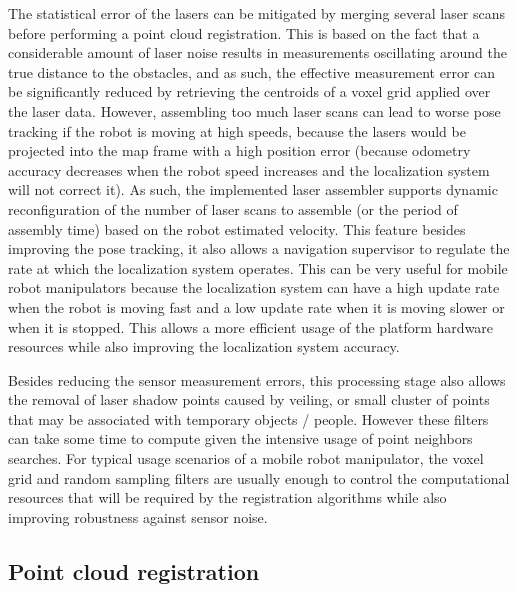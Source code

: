 The statistical error of the lasers can be mitigated by merging several laser scans before performing a point cloud registration. This is based on the fact that a considerable amount of laser noise results in measurements oscillating around the true distance to the obstacles, and as such, the effective measurement error can be significantly reduced by retrieving the centroids of a voxel grid applied over the laser data. However, assembling too much laser scans can lead to worse pose tracking if the robot is moving at high speeds, because the lasers would be projected into the map frame with a high position error (because odometry accuracy decreases when the robot speed increases and the localization system will not correct it). As such, the implemented laser assembler supports dynamic reconfiguration of the number of laser scans to assemble (or the period of assembly time) based on the robot estimated velocity. This feature besides improving the pose tracking, it also allows a navigation supervisor to regulate the rate at which the localization system operates. This can be very useful for mobile robot manipulators because the localization system can have a high update rate when the robot is moving fast and a low update rate when it is moving slower or when it is stopped. This allows a more efficient usage of the platform hardware resources while also improving the localization system accuracy.

Besides reducing the sensor measurement errors, this processing stage also allows the removal of laser shadow points caused by veiling, or small cluster of points that may be associated with temporary objects / people. However these filters can take some time to compute given the intensive usage of point neighbors searches. For typical usage scenarios of a mobile robot manipulator, the voxel grid and random sampling filters are usually enough to control the computational resources that will be required by the registration algorithms while also improving robustness against sensor noise.



\subsection{Point cloud registration}


